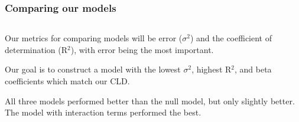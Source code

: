 \documentclass{beamer}
\begin{document}
	\begin{frame}
	\frametitle{Comparing our models}
		\begin{columns}
	\begin{compactitem}[$\bullet$]
					\begin{small}
		\item Our metrics for comparing models will be error ($\sigma$$^2$) and the coefficient of determination (R$^2$), with error being the most important.
		\item Our goal is to construct a model with the lowest $\sigma$$^2$, highest R$^2$, and beta coefficients which match our CLD. 
		\item All three models performed better than the null model, but only slightly better.  The model with interaction terms performed the best.
				\end{small}
	\end{compactitem}


\end{columns}
\end{frame}
\end{document}
